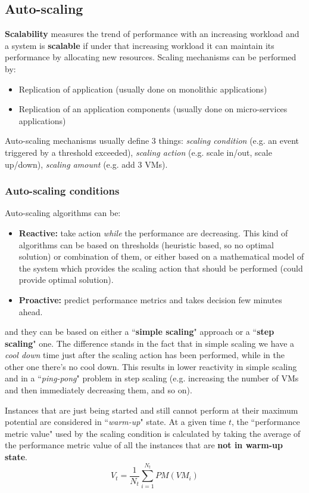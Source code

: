 \documentclass{article}
\begin{document}
\subsection{Auto-scaling}
\textbf{Scalability} measures the trend of performance with an increasing workload and a system is \textbf{scalable} if under that increasing workload it can maintain its performance by allocating new resources. Scaling mechanisms can be performed by:
\begin{itemize}
    \item Replication of application (usually done on monolithic applications)
    \item Replication of an application components (usually done on micro-services applications)
\end{itemize}
Auto-scaling mechanisms usually define 3 things: \textit{scaling condition} (e.g. an event triggered by a threshold exceeded), \textit{scaling action} (e.g. scale in/out, scale up/down), \textit{scaling amount} (e.g. add 3 VMs).

\subsubsection{Auto-scaling conditions}
Auto-scaling algorithms can be:
\begin{itemize}
    \item \textbf{Reactive:} take action \textit{while} the performance are decreasing. This kind of algorithms can be based on thresholds (heuristic based, so no optimal solution) or combination of them, or either based on a mathematical model of the system which provides the scaling action that should be performed (could provide optimal solution).
    \item \textbf{Proactive:} predict performance metrics and takes decision few minutes ahead.
\end{itemize}
and they can be based on either a ``\textbf{simple scaling}" approach or a ``\textbf{step scaling}" one. The difference stands in the fact that in simple scaling we have a \textit{cool down} time just after the scaling action has been performed, while in the other one there's no cool down. This results in lower reactivity in simple scaling and in a ``\textit{ping-pong}" problem in step scaling (e.g. increasing the number of VMs and then immediately decreasing them, and so on).

\bigskip
Instances that are just being started and still cannot perform at their maximum potential are considered in ``\textit{warm-up}" state.
At a given time $t$, the ``performance metric value" used by the scaling condition is calculated by taking the average of the performance metric value of all the instances that are \textbf{not in warm-up state}.
$$V_t = \frac{1}{N_t}\sum^{N_t}_{i=1}{PM(VM_i)}$$
\end{document}
